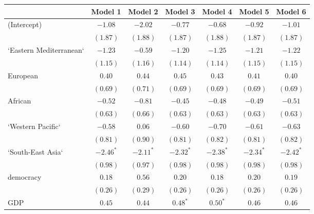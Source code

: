 
\begin{table}[!h]
\begin{center}
\begin{tabular}{l c c c c c c }
\toprule
 & Model 1 & Model 2 & Model 3 & Model 4 & Model 5 & Model 6 \\
\midrule
(Intercept)             & $-1.08$      & $-2.02$      & $-0.77$      & $-0.68$      & $-0.92$      & $-1.01$      \\
                        & $(1.87)$     & $(1.88)$     & $(1.87)$     & $(1.88)$     & $(1.87)$     & $(1.87)$     \\
`Eastern Mediterranean` & $-1.23$      & $-0.59$      & $-1.20$      & $-1.25$      & $-1.21$      & $-1.22$      \\
                        & $(1.15)$     & $(1.16)$     & $(1.14)$     & $(1.14)$     & $(1.15)$     & $(1.15)$     \\
European                & $0.40$       & $0.44$       & $0.45$       & $0.43$       & $0.41$       & $0.40$       \\
                        & $(0.69)$     & $(0.71)$     & $(0.69)$     & $(0.69)$     & $(0.69)$     & $(0.69)$     \\
African                 & $-0.52$      & $-0.81$      & $-0.45$      & $-0.48$      & $-0.49$      & $-0.51$      \\
                        & $(0.63)$     & $(0.66)$     & $(0.63)$     & $(0.63)$     & $(0.63)$     & $(0.63)$     \\
`Western Pacific`       & $-0.58$      & $0.06$       & $-0.60$      & $-0.70$      & $-0.61$      & $-0.63$      \\
                        & $(0.81)$     & $(0.90)$     & $(0.81)$     & $(0.82)$     & $(0.81)$     & $(0.82)$     \\
`South-East Asia`       & $-2.46^{*}$  & $-2.11^{*}$  & $-2.32^{*}$  & $-2.38^{*}$  & $-2.34^{*}$  & $-2.42^{*}$  \\
                        & $(0.98)$     & $(0.97)$     & $(0.98)$     & $(0.98)$     & $(0.98)$     & $(0.98)$     \\
democracy               & $0.18$       & $0.56$       & $0.20$       & $0.18$       & $0.20$       & $0.19$       \\
                        & $(0.26)$     & $(0.29)$     & $(0.26)$     & $(0.26)$     & $(0.26)$     & $(0.26)$     \\
GDP                     & $0.45$       & $0.44$       & $0.48^{*}$   & $0.50^{*}$   & $0.46$       & $0.46$       \\

\end{tabular}
\end{center}
\end{table}
